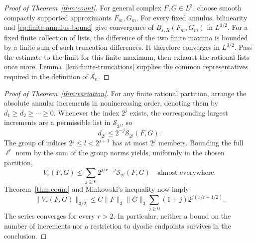 \begin{proof}[Proof of Theorem~\ref{thm:count}]
For general complex $F,G\in L^3$, choose smooth compactly supported
approximants $F_m,G_m$. For every fixed annulus, bilinearity and
\eqref{eq:finite-annulus-bound} give convergence of
$B_{\varepsilon,R}(F_m,G_m)$ in $L^{3/2}$.
For a fixed finite collection of lists, the difference of the two
finite maxima is bounded by a finite sum of such truncation differences.
It therefore converges in $L^{3/2}$. Pass the estimate to the limit
for this finite maximum, then exhaust the rational lists once more.
Lemma~\ref{lem:finite-truncations} supplies the common representatives
required in the definition of $\mathcal S_n$.
\end{proof}

\begin{proof}[Proof of Theorem~\ref{thm:variation}]
For any finite rational partition, arrange the absolute annular
increments in nonincreasing order, denoting them by
$d_1\ge d_2\ge\cdots\ge0$. Whenever the index $2^j$ exists,
the corresponding largest increments are a permissible list in
$\mathcal S_{2^j}$, so
\[
 d_{2^j}\le2^{-j}\mathcal S_{2^j}(F,G).
\]
The group of indices $2^j\le l<2^{j+1}$ has at most $2^j$ members.
Bounding the full $\ell^r$ norm by the sum of the group norms yields,
uniformly in the chosen partition,
\begin{equation}\label{eq:rank-variation}
 V_r(F,G)\le\sum_{j\ge0}2^{j/r-j}\mathcal S_{2^j}(F,G)
 \quad\text{almost everywhere}.
\end{equation}
Theorem~\ref{thm:count} and Minkowski's inequality now imply
\[
 \|V_r(F,G)\|_{3/2}
 \le C\|F\|_3\|G\|_3
       \sum_{j\ge0}(1+j)2^{j(1/r-1/2)}.
\]
The series converges for every $r>2$. In particular, neither a bound
on the number of increments nor a restriction to dyadic endpoints
survives in the conclusion.
\end{proof}
